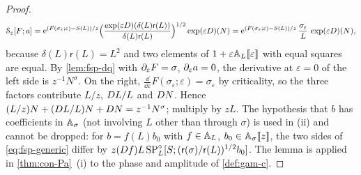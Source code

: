 \begin{proof}
\[
\mathcal S_\varepsilon[F;a]=\mathrm{e}^{(F(\sigma_\varepsilon;\varepsilon)-S(L))/z}\Bigl(\frac{\exp(\varepsilon D)(\delta(L)\mathsf r(L))}{\delta(L)\mathsf r(L)}\Bigr)^{1/2}\exp(\varepsilon D)(N)=\mathrm{e}^{(F(\sigma_\varepsilon;\varepsilon)-S(L))/z}\,\frac{\sigma_\varepsilon}L\,\exp(\varepsilon D)(N),
\]
because $\delta(L)\mathsf r(L)=L^2$ and two elements of $1+\varepsilon\mathbb{A}_{L}[\![ \varepsilon ]\!]$ with equal squares are equal. By \cref{lem:fsp-dq} with $\partial_\varepsilon F=\sigma$, $\partial_\varepsilon a=0$, the derivative at $\varepsilon=0$ of the left side is $z^{-1}N^\sigma$. On the right, $\frac{\dd}{\dd\varepsilon}F(\sigma_\varepsilon;\varepsilon)=\sigma_\varepsilon$ by criticality, so the three factors contribute $L/z$, $D L/L$ and $D N$. Hence $(L/z)N+(D L/L)N+D N=z^{-1}N^\sigma$; multiply by $zL$. The hypothesis that $b$ has coefficients in $\mathbb{A}_\sigma$ (not involving $L$ other than through $\sigma$) is used in (ii) and cannot be dropped: for $b=f(L)b_0$ with $f\in\mathbb{A}_{L}$, $b_0\in\mathbb{A}_\sigma[\![ z ]\!]$, the two sides of \eqref{eq:fsp-generic} differ by $z(D f)L\,\mathrm{SP}^{\circ}_L[S;(\mathsf r(\sigma)/\mathsf r(L))^{1/2}b_0]$. The lemma is applied in \cref{thm:con-Pa}~(i) to the phase and amplitude of \cref{def:gam-c}.
\end{proof}


